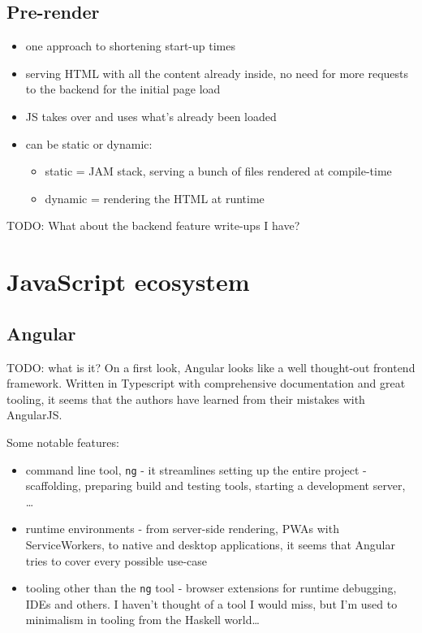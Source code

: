 \documentclass[english,odsaz]{fitthesis}
\begin{document}
\subsection{Pre-render}
\label{sec:org6246010}
\begin{itemize}
\item one approach to shortening start-up times
\item serving HTML with all the content already inside, no need for more requests to
the backend for the initial page load
\item JS takes over and uses what's already been loaded
\item can be static or dynamic:
\begin{itemize}
\item static = JAM stack, serving a bunch of files rendered at compile-time
\item dynamic = rendering the HTML at runtime
\end{itemize}
\end{itemize}

TODO: What about the backend feature write-ups I have?

\section{JavaScript ecosystem}
\label{sec:org4db5855}
\subsection{Angular}
\label{sec:org48cf689}
TODO: what is it?
On a first look, Angular looks like a well thought-out frontend
framework. Written in Typescript with comprehensive documentation and great
tooling, it seems that the authors have learned from their mistakes with
AngularJS.

Some notable features:
\begin{itemize}
\item command line tool, \texttt{ng} - it streamlines setting up the entire project -
scaffolding, preparing build and testing tools, starting a
development server, \ldots{}
\item runtime environments - from server-side rendering, PWAs with ServiceWorkers,
to native and desktop applications, it seems that Angular tries to cover every
possible use-case
\item tooling other than the \texttt{ng} tool - browser extensions for runtime debugging,
IDEs and others. I haven't thought of a tool I would miss, but I'm used to
minimalism in tooling from the Haskell world\ldots{}
\end{itemize}
\end{document}

